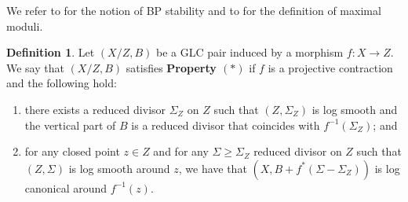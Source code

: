 \documentclass[12pt]{amsart}
\theoremstyle{plain}
\theoremstyle{definition}
\newtheorem{definition}[theorem]{Definition}
\def\K#1.{K_{#1}}
\begin{document}
We refer to \cite[Definition 2.5]{ACSS} for the notion of BP stability and to \cite[Definition 2.20]{ACSS}
for the definition of maximal moduli.


\begin{definition}\label{d_property*}
Let $(X/Z,B)$ be a GLC pair induced by a  morphism $f\colon X\to Z$.  
We say that $(X/Z,B)$ satisfies {\bf Property $(*)$} if $f$ is a projective  contraction and the following hold:
\begin{enumerate}
\item  there exists a reduced divisor $\Sigma_Z$ on $Z$  such that $(Z,\Sigma_Z)$ is log smooth and 
the vertical part of $B$ is a reduced divisor that coincides with 
$f^{-1}(\Sigma_Z)$; and 
\item for any closed point $z\in Z$ and for any  $\Sigma\ge \Sigma_Z$ reduced 
divisor on $Z$ such that $(Z,\Sigma)$ is log smooth around $z$,  
we have that $(X,B+f^*(\Sigma-\Sigma_Z))$ is log canonical around $f^{-1}(z)$.
\end{enumerate}
\end{definition}
\end{document}
